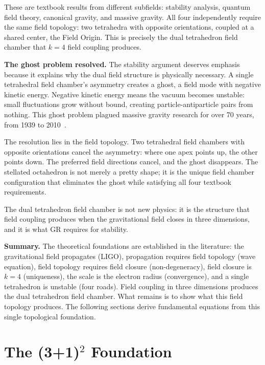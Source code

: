 \documentclass[aps,prd,preprint,superscriptaddress,showpacs,preprintnumbers,amsmath,amssymb,nofootinbib]{revtex4-2}
\begin{document}
These are textbook results from different subfields: stability analysis, quantum field theory, canonical gravity, and massive gravity. All four independently require the same field topology: two tetrahedra with opposite orientations, coupled at a shared center, the Field Origin. This is precisely the dual tetrahedron field chamber that $k = 4$ field coupling produces.

\textbf{The ghost problem resolved.} The stability argument deserves emphasis because it explains why the dual field structure is physically necessary. A single tetrahedral field chamber's asymmetry creates a ghost, a field mode with negative kinetic energy. Negative kinetic energy means the vacuum becomes unstable: small fluctuations grow without bound, creating particle-antiparticle pairs from nothing. This ghost problem plagued massive gravity research for over 70 years, from 1939 to 2010~\cite{boulware1972}.

The resolution lies in the field topology. Two tetrahedral field chambers with opposite orientations cancel the asymmetry: where one apex points up, the other points down. The preferred field directions cancel, and the ghost disappears. The stellated octahedron is not merely a pretty shape; it is the unique field chamber configuration that eliminates the ghost while satisfying all four textbook requirements.

The dual tetrahedron field chamber is not new physics: it is the structure that field coupling produces when the gravitational field closes in three dimensions, and it is what GR requires for stability.

\vspace{1em}
\noindent\textbf{Summary.} The theoretical foundations are established in the literature: the gravitational field propagates (LIGO), propagation requires field topology (wave equation), field topology requires field closure (non-degeneracy), field closure is $k = 4$ (uniqueness), the scale is the electron radius (convergence), and a single tetrahedron is unstable (four roads). Field coupling in three dimensions produces the dual tetrahedron field chamber. What remains is to show what this field topology produces. The following sections derive fundamental equations from this single topological foundation.

\section{The (3+1)$^2$ Foundation}
\label{sec:foundation}
\end{document}
